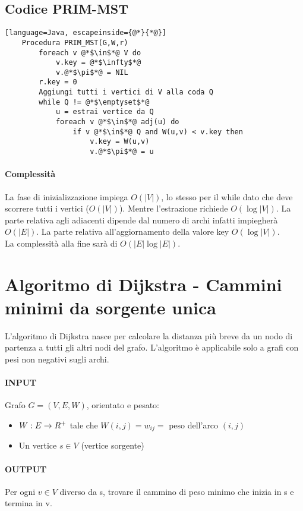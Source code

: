 \subsection{Codice PRIM-MST}
\begin{lstlisting}[language=Java, escapeinside={@*}{*@}]
    Procedura PRIM_MST(G,W,r)
        foreach v @*$\in$*@ V do
            v.key = @*$\infty$*@
            v.@*$\pi$*@ = NIL
        r.key = 0
        Aggiungi tutti i vertici di V alla coda Q
        while Q != @*$\emptyset$*@
            u = estrai vertice da Q
            foreach v @*$\in$*@ adj(u) do
                if v @*$\in$*@ Q and W(u,v) < v.key then
                    v.key = W(u,v)
                    v.@*$\pi$*@ = u
\end{lstlisting}
\paragraph*{Complessità} La fase di inizializzazione impiega $O(|V|)$, lo stesso
per il while dato che deve scorrere tutti i vertici ($O(|V|)$). Mentre l'estrazione
richiede $O(\log |V|)$. La parte relativa agli adiacenti dipende dal numero di archi
infatti impiegherà $O(|E|)$. La parte relativa all'aggiornamento della valore key 
$O(\log |V|)$.\\
La complessità alla fine sarà di $O(|E|\log |E|)$.

\section{Algoritmo di Dijkstra - Cammini minimi da sorgente unica}
L'algoritmo di Dijkstra nasce per calcolare la distanza più breve da un nodo di partenza
a tutti gli altri nodi del grafo. L'algoritmo è applicabile solo a grafi con pesi non negativi
sugli archi.
\paragraph*{INPUT} Grafo $G = (V,E,W)$, orientato e pesato:
\begin{itemize}
    \item $W:E \rightarrow R^+$ tale che $W(i,j) = w_{ij} =$ peso dell'arco $(i,j)$
    \item Un vertice $s \in V$ (vertice sorgente)
\end{itemize}
\paragraph*{OUTPUT} Per ogni $v \in V$ diverso da s, trovare il cammino di peso minimo che inizia
in s e termina in v.
